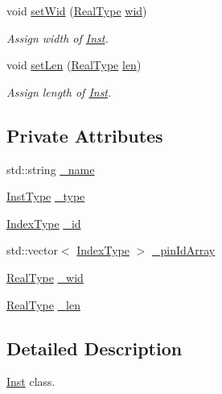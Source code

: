 \begin{DoxyCompactItemize}
void \hyperlink{classInst_a0667cb5b7b7ef52c67ce0f2514b933b0}{set\+Wid} (\hyperlink{type_8h_a51898ad9e46b1265f3fab67f7d4b04a2}{Real\+Type} \hyperlink{classInst_a18cd79f2cb3e30b1d8731381d311a919}{wid})
\begin{DoxyCompactList}\small\item\em Assign width of \hyperlink{classInst}{Inst}. \end{DoxyCompactList}\item 
void \hyperlink{classInst_a63908bff80f6af5034e6d51e894a54e2}{set\+Len} (\hyperlink{type_8h_a51898ad9e46b1265f3fab67f7d4b04a2}{Real\+Type} \hyperlink{classInst_ab90470caf2f50b7127ee6946d93d449e}{len})
\begin{DoxyCompactList}\small\item\em Assign length of \hyperlink{classInst}{Inst}. \end{DoxyCompactList}\end{DoxyCompactItemize}
\subsection*{Private Attributes}
\begin{DoxyCompactItemize}
\item 
std\+::string \hyperlink{classInst_a2f11b1c4d2151470182e0d24f7bddbbb}{\+\_\+name}
\item 
\hyperlink{type_8h_a53644c687d6bc203d9d3d3ee70075f61}{Inst\+Type} \hyperlink{classInst_a71f59c0ab13351f33a67c57839aa5e3d}{\+\_\+type}
\item 
\hyperlink{type_8h_a581e8093e28e7362f2b6937296190676}{Index\+Type} \hyperlink{classInst_a11c7c07b99b2a60e9637a3a1a67911e5}{\+\_\+id}
\item 
std\+::vector$<$ \hyperlink{type_8h_a581e8093e28e7362f2b6937296190676}{Index\+Type} $>$ \hyperlink{classInst_aba5f13fac393f1f506630ef1259853b7}{\+\_\+pin\+Id\+Array}
\item 
\hyperlink{type_8h_a51898ad9e46b1265f3fab67f7d4b04a2}{Real\+Type} \hyperlink{classInst_ad9ded5bad369f4ab225372c839820ab9}{\+\_\+wid}
\item 
\hyperlink{type_8h_a51898ad9e46b1265f3fab67f7d4b04a2}{Real\+Type} \hyperlink{classInst_acb3bddc4216dba958466c34fb5698adc}{\+\_\+len}
\end{DoxyCompactItemize}


\subsection{Detailed Description}
\hyperlink{classInst}{Inst} class. 

